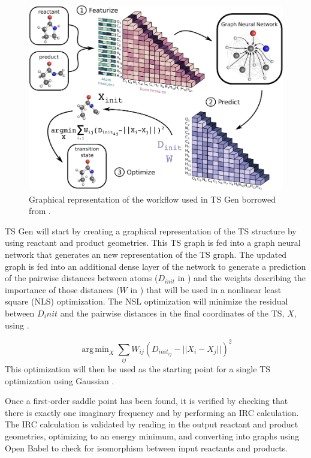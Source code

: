 \documentclass[preprint, 11pt]{elsarticle} %
\DeclareMathOperator*{\argmin}{arg\,min}
\begin{document}
\begin{figure}[htbp]
    \centering
    \includegraphics{ts-gen}
    \caption{Graphical representation of the workflow used in TS Gen borrowed from \cite{pattanaik:2020}.}
    \label{fig:ts_gen}
\end{figure}

TS Gen will start by creating a graphical representation of the TS structure by using reactant and product geometries.
This TS graph is fed into a graph neural network that generates an new representation of the TS graph.
The updated graph is fed into an additional dense layer of the network to generate a prediction of the pairwise distances between atoms ($D_{init}$ in ) and the weights describing the importance of those distances ($W$ in ) that will be used in a nonlinear least square (NLS) optimization.
The NSL optimization will minimize the residual between $D_init$ and the pairwise distances in the final coordinates of the TS, $X$, using .

\begin{equation}
    \argmin_X \sum\limits_{ij} W_{ij} ( D_{init_{ij}} - || X_i - X_j ||)^2
    \label{eq:ts_gen}
\end{equation}
This optimization will then be used as the starting point for a single TS optimization using Gaussian \cite{Gaussian:2009}.

Once a first-order saddle point has been found, it is verified by checking that there is exactly one imaginary frequency and by performing an IRC calculation.
The IRC calculation is validated by reading in the output reactant and product geometries, optimizing to an energy minimum, and converting into graphs using Open Babel \cite{openbabel:2011} to check for isomorphism between input reactants and products.
\end{document}

